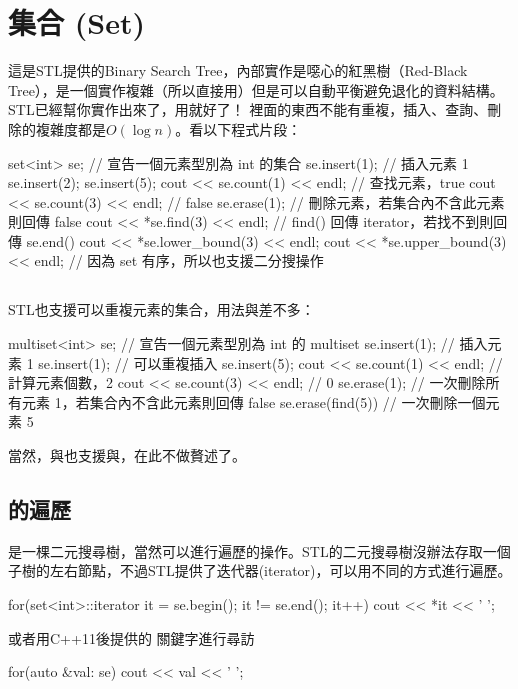 \documentclass[main.tex]{subfiles}
\begin{document}
\section{集合 (Set)}
這是STL提供的Binary Search Tree，內部實作是噁心的紅黑樹（Red-Black Tree），是一個實作複雜（所以直接用）但是可以自動平衡避免退化的資料結構。STL已經幫你實作出來了，用就好了！ 裡面的東西不能有重複，插入、查詢、刪除的複雜度都是$O(\log n)$。看以下程式片段：
\begin{C++}
set<int> se; // 宣告一個元素型別為 int 的集合
se.insert(1); // 插入元素 1
se.insert(2);
se.insert(5);
cout << se.count(1) << endl; // 查找元素，true
cout << se.count(3) << endl; // false
se.erase(1); // 刪除元素，若集合內不含此元素則回傳 false
cout << *se.find(3) << endl;
// find() 回傳 iterator，若找不到則回傳 se.end()
cout << *se.lower_bound(3) << endl;
cout << *se.upper_bound(3) << endl;
// 因為 set 有序，所以也支援二分搜操作
\end{C++}
\subsection{}
STL也支援可以重複元素的集合，用法與差不多：
\begin{C++}
multiset<int> se; // 宣告一個元素型別為 int 的 multiset
se.insert(1); // 插入元素 1
se.insert(1); // 可以重複插入
se.insert(5);
cout << se.count(1) << endl; // 計算元素個數，2
cout << se.count(3) << endl; // 0
se.erase(1); 
// 一次刪除所有元素 1，若集合內不含此元素則回傳 false
se.erase(find(5)) // 一次刪除一個元素 5
\end{C++}
\indent\indent 當然，與也支援與，在此不做贅述了。
\subsection{的遍歷}
是一棵二元搜尋樹，當然可以進行遍歷的操作。STL的二元搜尋樹沒辦法存取一個子樹的左右節點，不過STL提供了迭代器(iterator)，可以用不同的方式進行遍歷。
\begin{C++}
for(set<int>::iterator it = se.begin(); it != se.end(); it++)
    cout << *it << ' ';
\end{C++}
\indent\indent 或者用C++11後提供的  關鍵字進行尋訪
\begin{C++}
for(auto &val: se)
    cout << val << ' ';
\end{C++}
\end{document}
